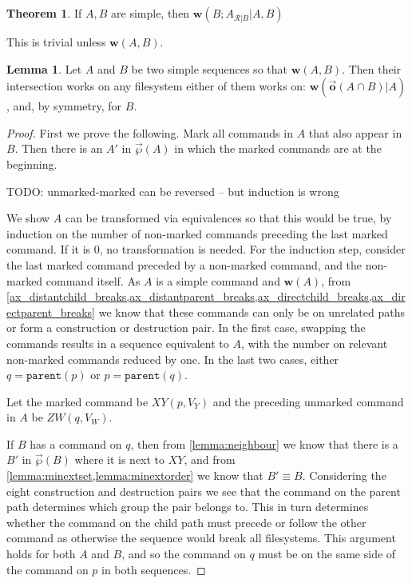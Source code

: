 \documentclass[12pt]{article}
\newcommand{\parent}{\mathtt{parent}}
\newcommand{\fscommand}[2]{{#1#2}}
\newcommand{\cxy}{\fscommand{X}{Y}}
\newcommand{\czw}{\fscommand{Z}{W}}
\newcommand{\works}[1]{{\mathbf{w}}({#1})}
\newcommand{\worksc}[2]{{\mathbf{w}}({#1}|{#2})}
\newcommand{\orderset}[1]{\vec{\wp}({#1})}
\newcommand{\ordered}[1]{\vec{\mathbf{o}}({#1})}
\newcommand{\recchar}[3]{{#1}^{#3}_{\mathcal{R}|{#2}}}
\newcommand{\reca}{\recchar{A}{B}{}} %
\theoremstyle{definition}
\newtheorem{mylem}{Lemma}
\newtheorem{myth}{Theorem}
\begin{document}
\begin{myth}
If $A, B$ are simple, then $\worksc{B;\reca}{A,B}$
\end{myth}

This is trivial unless $\works{A,B}$.

\begin{mylem}
Let $A$ and $B$ be two simple sequences so that $\works{A, B}$.
Then their intersection works on any filesystem
either of them works on:
$\worksc{\ordered{A\cap B}}{A}$, and, by symmetry, for $B$.
\end{mylem}

\begin{proof}
First we prove the following.
Mark all commands in $A$ that also appear in $B$.
Then there is an $A'$ in $\orderset{A}$ in which the marked commands are at the beginning.

\medskip

TODO: unmarked-marked can be reversed -- but induction is wrong

We show $A$ can be transformed via equivalences so that this would be true,
by induction on the number of non-marked commands preceding the last marked command.
If it is 0, no transformation is needed.
For the induction step, consider the last marked command preceded by a non-marked command,
and the non-marked command itself.
As $A$ is a simple command and $\works{A}$, from 
\cref{ax_distantchild_breaks,ax_distantparent_breaks,ax_directchild_breaks,ax_directparent_breaks}
we know that these commands can only be on unrelated paths or form a construction or destruction pair.
In the first case, swapping the commands results in a sequence equivalent to $A$,
with the number on relevant non-marked commands reduced by one.
In the last two cases,
either $q=\parent(p)$ or $p=\parent(q)$.

Let the marked command be $\cxy(p, V_Y)$ and the preceding unmarked command in $A$ be $\czw(q, V_W)$.

If $B$ has a command on $q$, then
from \cref{lemma:neighbour}
we know that there is a $B'$ in $\orderset{B}$ where it is next to $\cxy$,
and from \cref{lemma:minextset,lemma:minextorder} we know that $B'\equiv B$.
Considering the eight construction and destruction pairs we see that the command
on the parent path determines which group the pair belongs to.
This in turn determines whether the command on the child path must
precede or follow the other command as otherwise the sequence would break all filesystems.
This argument holds for both $A$ and $B$, and so the command on $q$ must be on
the same side of the command on $p$ in both sequences.


\end{proof}
\end{document}
